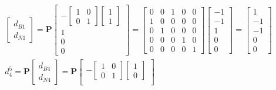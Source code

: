 \documentclass[11pt]{article}
\begin{document}
\begin{enumerate}
\begin{align*}
\begin{bmatrix}
         d_{B1} \\ d_{N1}
      \end{bmatrix}
      =
      \textbf{P}
      \begin{bmatrix}
        -
        \begin{bmatrix}
         1 & 0 \\ 0 & 1   
        \end{bmatrix}
        \begin{bmatrix}
            1 \\ 1
        \end{bmatrix} \\
        1 \\ 0 \\ 0
      \end{bmatrix}
      = 
      \begin{bmatrix}
        0 & 0 & 1 & 0 & 0 \\
        1 & 0 & 0 & 0 & 0 \\
        0 & 1 & 0 & 0 & 0 \\
        0 & 0 & 0 & 1 & 0 \\
        0 & 0 & 0 & 0 & 1
      \end{bmatrix}
      \begin{bmatrix}
        -1 \\ -1 \\ 1 \\ 0 \\ 0
      \end{bmatrix}
      =
      \begin{bmatrix}
        1 \\ -1 \\ -1 \\ 0 \\ 0
      \end{bmatrix}
      \\
      d_4^5 = \textbf{P}
      \begin{bmatrix}
         d_{B4} \\ d_{N4}
      \end{bmatrix}
      =
      \textbf{P}
      \begin{bmatrix}
        -
        \begin{bmatrix}
         1 & 0 \\ 0 & 1   
        \end{bmatrix}
        \begin{bmatrix}
            1 \\ 0
        \end{bmatrix} \\

\end{bmatrix}
\end{align*}
\end{enumerate}
\end{document}
